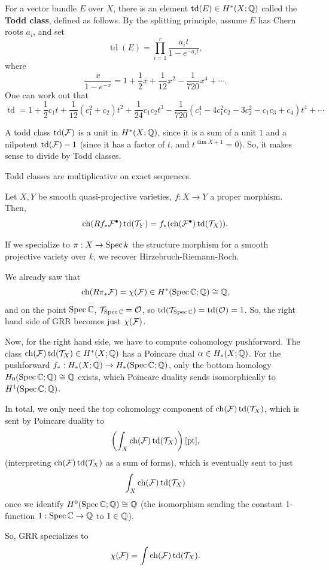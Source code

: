 \documentclass[12pt]{article}
\DeclareMathOperator{\chern}{ch}
\DeclareMathOperator{\todd}{td}
\begin{document}
\begin{defn}
    For a vector bundle $E$ over $X$, there is an element $\todd(E) \in H^*(X;\Q)$ called the \textbf{Todd class}, defined as follows. By the splitting principle, assume $E$ has Chern roots $a_i$, and set
    \[\todd(E) = \prod_{i=1}^r \frac{a_i t}{1-e^{-a_i t}},\]
    where
    \[\frac{x}{1-e^{-x}} = 1 + \frac{1}{2}x + \frac{1}{12}x^2 - \frac{1}{720}x^4 + \cdots.\]
    One can work out that
    \[\todd = 1 + \frac{1}{2}c_1 t + \frac{1}{12}(c_1^2+c_2)t^2 + \frac{1}{24}c_1c_2 t^3 -\frac{1}{720}(c_1^4-4c_1^2c_2-3c_2^2-c_1c_3+c_4)t^4 + \cdots\]
\end{defn}

\begin{rmk}
    A todd class $\todd(\cF)$ is a unit in $H^*(X;\mathbb{Q})$, since it is a sum of a unit $1$ and a nilpotent $\todd(\cF)-1$ (since it has a factor of $t$, and $t^{\dim X+1}=0$). So, it makes sense to divide by Todd classes.
\end{rmk}

\begin{prop}
    Todd classes are multiplicative on exact sequences.
\end{prop}

\begin{thm}
    Let $X,Y$ be smooth quasi-projective varieties, $f:X\to Y$ a proper morphism. Then,
    \[\chern(Rf_* \cF^\bullet) \todd(\cT_Y) = f_*(\chern(\cF^\bullet)\todd(\cT_X)).\]
\end{thm}

If we specialize to $\pi: X\to \operatorname{Spec} k$ the structure morphism for a smooth projective variety over $k$, we recover Hirzebruch-Riemann-Roch.
\begin{eg}
    We already saw that
    \[\chern(R\pi_* \cF) = \chi(\cF) \in H^*(\Spec \C; \Q) \cong \Q,\]
    and on the point $\operatorname{Spec} \mathbb{C}$, $\mathcal{T}_{\operatorname{Spec} \mathbb{C}}=\mathcal{O}$, so $\todd(\cT_{\Spec \C}) = \todd(\cO) = 1$. So, the right hand side of GRR becomes just $\chi(\mathcal{F})$.

    Now, for the right hand side, we have to compute cohomology pushforward. The class $\chern(\cF)\todd(\cT_X) \in H^*(X;\Q)$ has a Poincare dual $\alpha \in H_*(X;\mathbb{Q})$. For the pushforward $f_*: H_*(X;\mathbb{Q}) \to H_*(\operatorname{Spec} \mathbb{C}; \mathbb{Q})$, only the bottom homology $H_0(\operatorname{Spec} \mathbb{C}; \mathbb{Q}) \cong \mathbb{Q}$ exists, which Poincare duality sends isomorphically to $H^1(\operatorname{Spec} \mathbb{C}; \mathbb{Q})$.
    
    In total, we only need the top cohomology component of $\chern(\cF)\todd(\cT_X)$, which is sent by Poincare duality to
    \[\left(\int_X \chern(\cF)\todd(\cT_X)\right)[\mathrm{pt}],\]
    (interpreting $\chern(\cF)\todd(\cT_X)$ as a sum of forms), which is eventually sent to just
    \[\int_X \chern(\cF)\todd(\cT_X)\]
    once we identify $H^0(\operatorname{Spec} \mathbb{C};\mathbb{Q}) \cong \mathbb{Q}$ (the isomorphism sending the constant 1-function $1: \operatorname{Spec} \mathbb{C}\to \mathbb{Q}$ to $1\in \mathbb{Q}$).
    
    So, GRR specializes to
    \[\chi(\cF) = \int \chern(\cF) \todd(\cT_X).\]
\end{eg}
\end{document}
